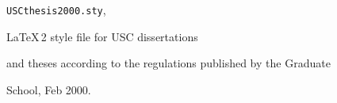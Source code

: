 \documentclass[11pt]{report}
\begin{document}


\begin{thebibliography}{99}

  \verb=USCthesis2000.sty=,

 \LaTeX\,2\raisebox{-0.2ex}{$\varepsilon$} style file for USC dissertations

 and theses according to the regulations published by the Graduate

 School, Feb 2000.

\end{thebibliography}
\end{document}
